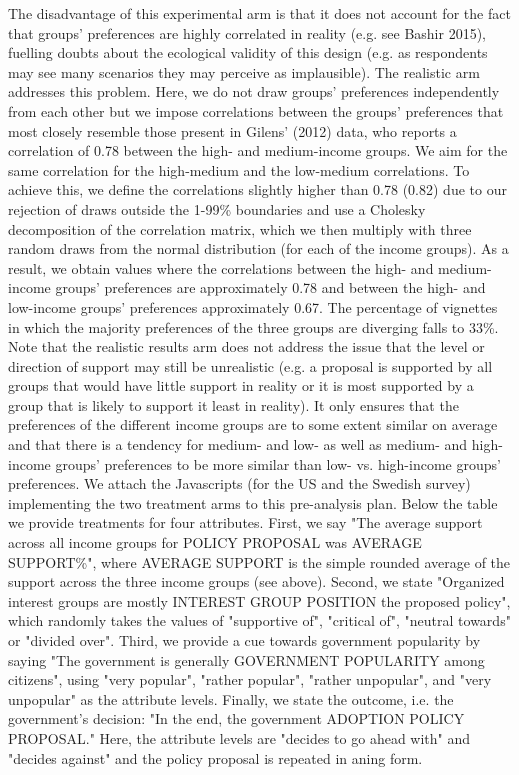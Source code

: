 \documentclass[12pt, letterpaper]{article}
\begin{document}
\begin{spacing}{1.5}
The disadvantage of this experimental arm is that it does not account for the fact that groups' preferences are highly correlated in reality (e.g. see Bashir 2015), fuelling doubts about the ecological validity of this design (e.g. as respondents may see many scenarios they may perceive as implausible). The realistic arm addresses this problem. Here, we do not draw groups' preferences independently from each other but we impose correlations between the groups' preferences that most closely resemble those present in Gilens' (2012) data, who reports a correlation of 0.78 between the high- and medium-income groups. We aim for the same correlation for the high-medium and the low-medium correlations. To achieve this, we define the correlations slightly higher than 0.78 (0.82) due to our rejection of draws outside the 1-99\% boundaries and use a Cholesky decomposition of the correlation matrix, which we then multiply with three random draws from the normal distribution (for each of the income groups). As a result, we obtain values where the correlations between the high- and medium-income groups' preferences are approximately 0.78 and between the high- and low-income groups' preferences approximately 0.67. The percentage of vignettes in which the majority preferences of the three groups are diverging falls to 33\%. Note that the realistic results arm does not address the issue that the level or direction of support may still be unrealistic (e.g. a proposal is supported by all groups that would have little support in reality or it is most supported by a group that is likely to support it least in reality). It only ensures that the preferences of the different income groups are to some extent similar on average and that there is a tendency for medium- and low- as well as medium- and high-income groups' preferences to be more similar than low- vs. high-income groups' preferences. We attach the Javascripts (for the US and the Swedish survey) implementing the two treatment arms to this pre-analysis plan.
Below the table we provide treatments for four attributes. First, we say "The average support across all income groups for POLICY PROPOSAL was AVERAGE SUPPORT\%", where AVERAGE SUPPORT is the simple rounded average of the support across the three income groups (see above). Second, we state "Organized interest groups are mostly INTEREST GROUP POSITION the proposed policy", which randomly takes the values of "supportive of", "critical of", "neutral towards" or "divided over". Third, we provide a cue towards government popularity by saying "The government is generally GOVERNMENT POPULARITY among citizens", using "very popular", "rather popular", "rather unpopular", and "very unpopular" as the attribute levels. Finally, we state the outcome, i.e. the government's decision: "In the end, the government ADOPTION POLICY PROPOSAL." Here, the attribute levels are "decides to go ahead with" and "decides against" and the policy proposal is repeated in aning form.


\end{spacing}
\end{document}
